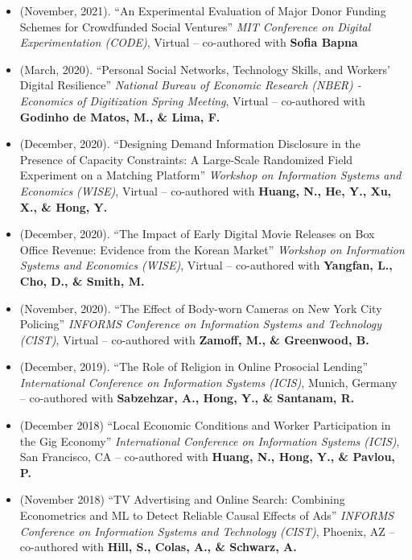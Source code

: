 \documentclass[10.5pt,letterpaper,sans]{moderncv}        %
\begin{document}
\begin{itemize}

\item (November, 2021). ``An Experimental Evaluation of Major Donor Funding Schemes for Crowdfunded Social Ventures'' \textit{MIT Conference on Digital Experimentation (CODE)}, Virtual -- co-authored with \textbf{Sofia Bapna} 

\item (March, 2020). ``Personal Social Networks, Technology Skills, and Workers' Digital Resilience'' \textit{National Bureau of Economic Research (NBER) - Economics of Digitization Spring Meeting}, Virtual -- co-authored with \textbf{Godinho de Matos, M., \& Lima, F.} 

\item (December, 2020). ``Designing Demand Information Disclosure in the Presence of Capacity Constraints: A Large-Scale Randomized Field Experiment on a Matching Platform'' \textit{Workshop on Information Systems and Economics (WISE)}, Virtual -- co-authored with \textbf{Huang, N., He, Y., Xu, X., \& Hong, Y.} 

\item (December, 2020). ``The Impact of Early Digital Movie Releases on Box Office Revenue: Evidence from the Korean Market'' \textit{Workshop on Information Systems and Economics (WISE)}, Virtual -- co-authored with \textbf{Yangfan, L., Cho, D., \& Smith, M.} 

\item (November, 2020). ``The Effect of Body-worn Cameras on New York City Policing'' \textit{INFORMS Conference on Information Systems and Technology (CIST)}, Virtual -- co-authored with \textbf{Zamoff, M., \& Greenwood, B.} 

\item (December, 2019). ``The Role of Religion in Online Prosocial Lending'' \textit{International Conference on Information Systems (ICIS)}, Munich, Germany -- co-authored with \textbf{Sabzehzar, A., Hong, Y., \& Santanam, R.} 

\item (December 2018) ``Local Economic Conditions and Worker Participation in the Gig Economy'' \textit{International Conference on Information Systems (ICIS)}, San Francisco, CA -- co-authored with \textbf{Huang, N., Hong, Y., \& Pavlou, P.} 

\item (November 2018) ``TV Advertising and Online Search: Combining Econometrics and ML to Detect Reliable Causal Effects of Ads'' \textit{INFORMS Conference on Information Systems and Technology (CIST)}, Phoenix, AZ -- co-authored with \textbf{Hill, S., Colas, A., \& Schwarz, A.}


\end{itemize}
\end{document}
